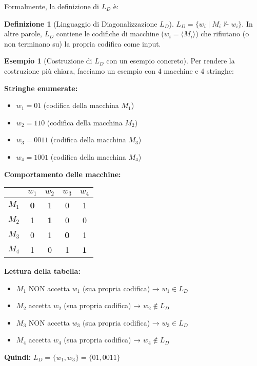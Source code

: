 \documentclass[a4paper]{article}
\theoremstyle{definition} %
\newtheorem{definition}{Definizione}
\newtheorem{example}{Esempio}
\theoremstyle{remark} %
\begin{document}
Formalmente, la definizione di $L_D$ è:
\begin{definition}[Linguaggio di Diagonalizzazione $L_D$]
$L_D = \{ w_i \mid M_i \nVdash w_i \}$.
In altre parole, $L_D$ contiene le codifiche di macchine ($w_i = \langle M_i \rangle$) che rifiutano (o non terminano su) la propria codifica come input.
\end{definition}

\begin{example}[Costruzione di $L_D$ con un esempio concreto]
Per rendere la costruzione più chiara, facciamo un esempio con 4 macchine e 4 stringhe:

\textbf{Stringhe enumerate:}
\begin{itemize}
    \item $w_1 = 01$ (codifica della macchina $M_1$)
    \item $w_2 = 110$ (codifica della macchina $M_2$)
    \item $w_3 = 0011$ (codifica della macchina $M_3$)
    \item $w_4 = 1001$ (codifica della macchina $M_4$)
\end{itemize}

\textbf{Comportamento delle macchine:}
\begin{center}
\begin{tabular}{c|cccc}
 & $w_1$ & $w_2$ & $w_3$ & $w_4$ \\
\hline
$M_1$ & \textbf{0} & 1 & 0 & 1 \\
$M_2$ & 1 & \textbf{1} & 0 & 0 \\
$M_3$ & 0 & 1 & \textbf{0} & 1 \\
$M_4$ & 1 & 0 & 1 & \textbf{1} \\
\end{tabular}
\end{center}

\textbf{Lettura della tabella:}
\begin{itemize}
    \item $M_1$ NON accetta $w_1$ (sua propria codifica) → $w_1 \in L_D$
    \item $M_2$ accetta $w_2$ (sua propria codifica) → $w_2 \notin L_D$
    \item $M_3$ NON accetta $w_3$ (sua propria codifica) → $w_3 \in L_D$
    \item $M_4$ accetta $w_4$ (sua propria codifica) → $w_4 \notin L_D$
\end{itemize}

\textbf{Quindi:} $L_D = \{w_1, w_3\} = \{01, 0011\}$


\end{example}
\end{document}

